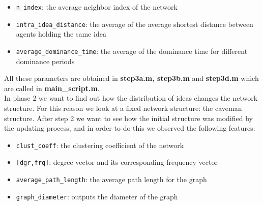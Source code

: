 \begin{itemize}
\item \verb+n_index+: the average neighbor index of the network
\item \verb+intra_idea_distance+: the average of the average shortest distance between agents holding the same idea
\item \verb+average_dominance_time+: the average of the dominance time for different dominance periods
\end{itemize}

\noindent All these parameters are obtained in \textbf{step3a.m, step3b.m} and \textbf{step3d.m} which are called in \textbf{main\_script.m}.
\\

\noindent In phase 2 we want to find out how the distribution of ideas changes the network structure. For this reason we look at a fixed network structure: the caveman structure. After step 2 we want to see how the initial structure was modified by the updating process, and in order to do this we observed the following features:

\begin{itemize}
\item \verb+clust_coeff+: the clustering coefficient of the network
\item  \verb+[dgr,frq]+: degree vector and its corresponding frequency vector 
\item \verb+average_path_length+: the average path length for the graph
\item \verb+graph_diameter+: outputs the diameter of the graph 

\end{itemize}








      
